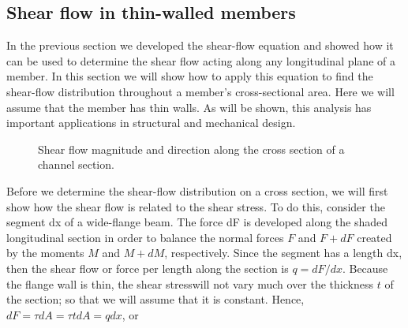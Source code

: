 \documentclass[
10pt,
a4paper,
openany,
svgnames,
]{kaobook} %
\begin{document}
\subsection{Shear flow in thin-walled members}

In the previous section we developed the shear-flow equation and showed how it can be used to determine the shear flow acting along any longitudinal plane of a member. In this section we will show how to apply this equation to find the shear-flow distribution throughout a member’s cross-sectional area. Here we will assume that the member has thin walls. As will be shown, this analysis has important applications in structural and mechanical design.

\begin{figure}[h]
  \centering
  \caption{Shear flow magnitude and direction along the cross section of a channel section.}
\end{figure}

Before we determine the shear-flow distribution on a cross section, we will first show how the shear flow is related to the shear stress. To do this, consider the segment dx of a wide-flange beam. The force dF is developed along the shaded longitudinal section in order to balance the normal forces $F$ and $F + dF$ created by the moments $M$ and $M + dM$, respectively. Since the segment has a length dx, then the shear flow or force per length along the section is $q = dF/dx$. Because the flange wall is thin, the shear stresswill not vary much over the thickness $t$ of the section; so that we will assume that it is constant. Hence, $dF = \tau dA = \tau t dA = qdx$, or 
\end{document}
